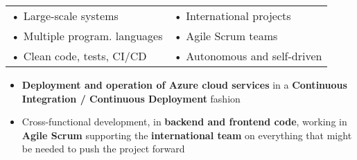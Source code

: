 \documentclass[10pt,a4paper]{altacv}
\begin{document}
\tagline{}

\begin{fullwidth}
\makecvheader
\end{fullwidth}


\begin{tabularx}{\linewidth}{X X}
	• Large-scale systems         & • International projects     \\
	• Multiple program. languages & • Agile Scrum teams          \\
	• Clean code, tests, CI/CD    & • Autonomous and self-driven
\end{tabularx}


\begin{itemize}
	\item \textbf{Deployment and operation of Azure cloud services} in a \textbf{Continuous Integration / Continuous Deployment} fashion
	\item Cross-functional development, in \textbf{backend and frontend code},  working in \textbf{Agile Scrum} supporting the \textbf{international team} on everything that might be needed to push the project forward
\end{itemize}

\divider
\end{document}
